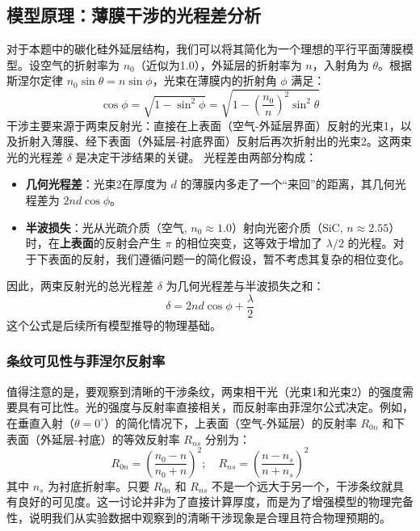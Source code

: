\documentclass[withoutpreface,bwprint]{cumcmthesis} %
\begin{document}
\subsection{模型原理：薄膜干涉的光程差分析}
对于本题中的碳化硅外延层结构，我们可以将其简化为一个理想的平行平面薄膜模型。设空气的折射率为 $n_0$（近似为1.0），外延层的折射率为 $n$，入射角为 $\theta$。根据斯涅尔定律 $n_0 \sin\theta = n \sin\phi$，光束在薄膜内的折射角 $\phi$ 满足：
\begin{equation}
    \cos\phi = \sqrt{1 - \sin^2\phi} = \sqrt{1 - \left(\frac{n_0}{n}\right)^2 \sin^2\theta}
\end{equation}
干涉主要来源于两束反射光：直接在上表面（空气-外延层界面）反射的光束1，以及折射入薄膜、经下表面（外延层-衬底界面）反射后再次折射出的光束2。这两束光的光程差 $\delta$ 是决定干涉结果的关键。
光程差由两部分构成：
\begin{itemize}
    \item \textbf{几何光程差}：光束2在厚度为 $d$ 的薄膜内多走了一个“来回”的距离，其几何光程差为 $2nd\cos\phi$。
    \item \textbf{半波损失}：光从光疏介质（空气, $n_0 \approx 1.0$）射向光密介质（SiC, $n \approx 2.55$）时，在\textbf{上表面}的反射会产生 $\pi$ 的相位突变，这等效于增加了 $\lambda/2$ 的光程。对于下表面的反射，我们遵循问题一的简化假设，暂不考虑其复杂的相位变化。
\end{itemize}
因此，两束反射光的总光程差 $\delta$ 为几何光程差与半波损失之和：
\begin{equation}
    \delta = 2nd\cos\phi + \frac{\lambda}{2}
    \label{eq:path_diff}
\end{equation}
这个公式是后续所有模型推导的物理基础。
\subsubsection{条纹可见性与菲涅尔反射率}
值得注意的是，要观察到清晰的干涉条纹，两束相干光（光束1和光束2）的强度需要具有可比性。光的强度与反射率直接相关，而反射率由菲涅尔公式决定。例如，在垂直入射（$\theta=0^\circ$）的简化情况下，上表面（空气-外延层）的反射率 $R_{0n}$ 和下表面（外延层-衬底）的等效反射率 $R_{ns}$ 分别为：
\begin{equation}
    R_{0n}=\left(\frac{n_0-n}{n_0+n}\right)^2; \quad R_{ns}=\left(\frac{n-n_s}{n+n_s}\right)^2
\end{equation}
其中 $n_s$ 为衬底折射率。只要 $R_{0n}$ 和 $R_{ns}$ 不是一个远大于另一个，干涉条纹就具有良好的可见度。这一讨论并非为了直接计算厚度，而是为了增强模型的物理完备性，说明我们从实验数据中观察到的清晰干涉现象是合理且符合物理预期的。
\end{document}
